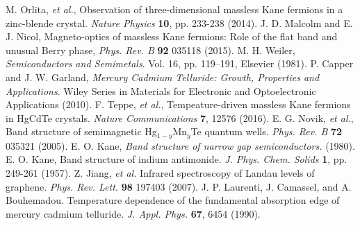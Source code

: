 \documentclass[titlepage,a4paper]{book}
\begin{document}
\begin{thebibliography}{199}
M. Orlita, \textit{et al.}, Observation of three-dimensional massless Kane fermions in a zinc-blende crystal. \textit{Nature Physics} \textbf{10}, pp. 233-238 (2014).
J. D. Malcolm and E. J. Nicol, Magneto-optics of massless Kane fermions: Role of the flat band and unusual Berry phase, \textit{Phys. Rev. B} \textbf{92} 035118 (2015).
M. H. Weiler, \textit{Semiconductors and Semimetals}. Vol. 16, pp. 119–191, Elsevier (1981).
P. Capper and J. W. Garland, \textit{Mercury Cadmium Telluride: Growth, Properties and Applications}. Wiley Series in Materials for Electronic and Optoelectronic Applications (2010).
F. Teppe, \textit{et al.}, Tempeature-driven massless Kane fermions in HgCdTe crystals. \textit{Nature Communications} \textbf{7}, 12576 (2016).
E. G. Novik, \textit{et al.}, Band structure of semimagnetic Hg$_{1-y}$Mn$_y$Te quantum wells. \textit{Phys. Rev. B} \textbf{72} 035321 (2005).
E. O. Kane, \textit{Band structure of narrow gap semiconductors.} (1980).
E. O. Kane, Band structure of indium antimonide. \textit{J. Phys. Chem. Solids} \textbf{1}, pp. 249-261 (1957).
Z. Jiang, \textit{et al.} Infrared spectroscopy of Landau levels of graphene. \textit{Phys. Rev. Lett.} \textbf{98} 197403 (2007).
J. P. Laurenti, J. Camassel, and A. Bouhemadou. Temperature dependence of the fundamental absorption edge of mercury cadmium telluride. \textit{J. Appl. Phys.} \textbf{67}, 6454 (1990).


\end{thebibliography}
\end{document}
